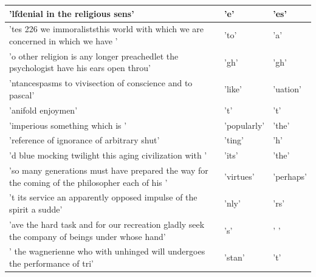 \documentclass[11pt,a4paper,bibliography=totocnumbered,listof=totocnumbered]{scrartcl}
\begin{document}
\begin{table}[H]
\begin{tabularx}{\textwidth}{X|X|X}
\hline 
'lfdenial in the religious sens' & 'e' & 'es' \\ 
\hline 
'tes  226 we immoraliststhis world with which we are concerned in which we have ' & 'to' & 'a' \\ 
\hline 
'o other religion is any longer preachedlet the psychologist have his ears open throu' & 'gh' & 'gh' \\ 
\hline 
'ntancespasms to vivisection of conscience and to pascal' & 'like' & 'uation' \\ 
\hline 
'anifold enjoymen' & 't' & 't' \\ 
\hline 
'imperious something which is ' & 'popularly' & 'the' \\ 
\hline 
'reference of ignorance of arbitrary shut' & 'ting' & 'h' \\ 
\hline 
'd blue mocking twilight this aging civilization with ' & 'its' & 'the' \\ 
\hline 
'so many generations must have prepared the way for the coming of the philosopher each of his ' & 'virtues' & 'perhaps' \\ 
\hline 
't its service an apparently opposed impulse of the spirit a sudde' & 'nly' & 'rs' \\ 
\hline 
'ave the hard task and for our recreation gladly seek the company of beings under whose hand' & 's' & ' ' \\ 
\hline 
' the wagnerienne who with unhinged will undergoes the performance of tri' & 'stan' & 't' \\ 
\hline 
\end{tabularx}
   \vskip 1pt
\end{table} 



\renewcommand\refname{Literature}


\pagebreak
\end{document}
